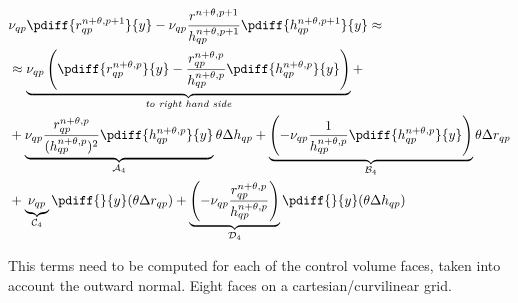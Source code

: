 \begin{align}
    & \nu_{qp} \pdiff{r^{n+\theta, p+1}_{qp}}{y}  -
\nu_{qp} \frac{r^{n+\theta, p+1}}{h^{n+\theta, p+1}_{qp}}\pdiff{ h^{n+\theta, p+1}_{qp}}{y} \approx
\\
    & \approx
\underbrace{\nu_{qp} \left( \pdiff{r^{n+\theta,p}_{qp}}{y} - \frac{r^{n+\theta,p}_{qp}}{h^{n+\theta,p}_{qp}} \pdiff{h^{n+\theta,p}_{qp}}{y} \right)}_{\textit {to right hand side}} +
%
\\*
& + \underbrace{\nu_{qp}  \frac{r^{n+\theta,p}_{qp}}{(h^{n+\theta,p}_{qp})^2} \pdiff{h^{n+\theta,p}_{qp}}{y}}_{{\cal{A}}_4} \theta \Delta h_{qp}
+ \underbrace{\left(- \nu_{qp} \frac{1}{h^{n+\theta,p}_{qp}}  \pdiff{h^{n+\theta,p}_{qp}}{y}\right)}_{{\cal{B}}_4} \theta \Delta r_{qp}
\\*
& +
\underbrace{\nu_{qp}}_{{\cal{C}}_4} \pdiff{}{y}(\theta \Delta r_{qp}) +
\underbrace{\left( -\nu_{qp} \frac{r^{n+\theta,p}_{qp}}{h^{n+\theta,p}_{qp}} \right)}_{{\cal{D}}_4} \pdiff{}{y}(\theta \Delta h_{qp})
\end{align}



This terms need to be computed for each of the control volume faces, taken into account the outward normal.
Eight faces on a cartesian/curvilinear grid.


